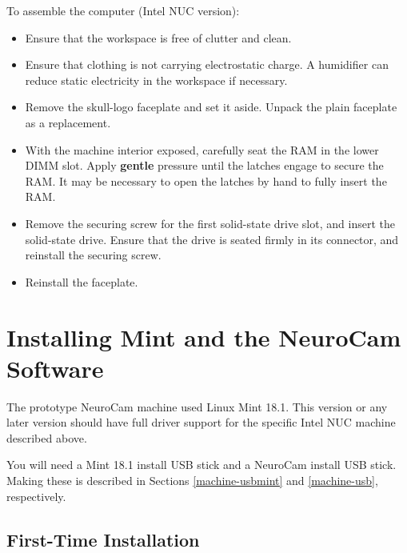 To assemble the computer (Intel NUC version):
\begin{itemize}
%
\item Ensure that the workspace is free of clutter and clean.

\item Ensure that clothing is not carrying electrostatic charge. A humidifier
can reduce static electricity in the workspace if necessary.

\item Remove the skull-logo faceplate and set it aside. Unpack the plain
faceplate as a replacement.

\item With the machine interior exposed, carefully seat the RAM in the lower
DIMM slot. Apply \textbf{gentle} pressure until the latches engage to secure
the RAM. It may be necessary to open the latches by hand to fully insert the
RAM.

\item Remove the securing screw for the first solid-state drive slot, and
insert the solid-state drive. Ensure that the drive is seated firmly in its
connector, and reinstall the securing screw.

\item Reinstall the faceplate.
%
\end{itemize}

%
%
%
\section{Installing Mint and the NeuroCam Software}

The prototype NeuroCam machine used Linux Mint 18.1. This version or any later
version should have full driver support for the specific Intel NUC machine
described above.

You will need a Mint 18.1 install USB stick and a NeuroCam install USB stick.
Making these is described in Sections \ref{machine-usbmint} and
\ref{machine-usb}, respectively.

%
\subsection{First-Time Installation}


